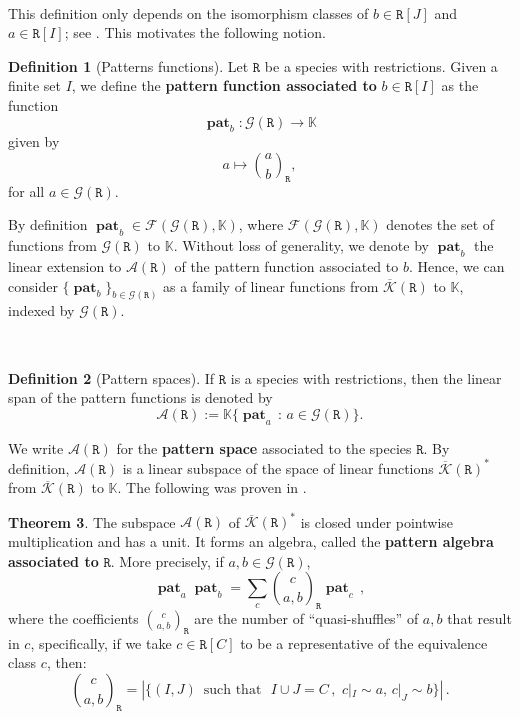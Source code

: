 \documentclass[12pt, reqno]{amsart}
\theoremstyle{definition}
\newtheorem{thm}{Theorem}[section]
\newtheorem{defin}[thm]{Definition}
\DeclareMathOperator{\pat}{\mathbf{pat}}
\newcommand{\prR}{\mathtt{R}}
\newcommand{\Kc}{\mathcal{K}}
\newcommand{\Kcb}{\overline{\Kc}}
\begin{document}
\

This definition only depends on the isomorphism classes of $b \in \prR[J]$ and $a \in \prR[I]$; see \cite{Penaguiao2020}. This motivates the following notion.

\begin{defin}[Patterns functions]\label{defin:pattern}
Let $\prR$ be a species with restrictions. Given a finite set $I$, we define the {\bf pattern function associated to} $b \in \prR[I]$ as the function
\[\pat_b: \mathcal{G}(\prR) \to \mathbb{K} \]
given by
\begin{equation}
    a \mapsto \binom{a}{b}_{\!\prR},
\end{equation}
for all $a \in \mathcal{G}(\prR)$.
\end{defin}

By definition $\pat_b \in \mathcal{F}(\mathcal{G}(\prR), \mathbb{K})$, where $\mathcal{F}(\mathcal{G}(\prR), \mathbb{K})$ denotes the set of functions from $\mathcal{G}(\prR)$ to $\mathbb{K}$. Without loss of generality, we denote by $\pat_b$ the linear extension to $\mathcal{A}(\mathtt{\prR})$ of the pattern function associated to $b$. Hence, we can consider $\{ \pat_b \}_{b\in \mathcal{G}(\prR)}$ as a family of linear functions from $\Kcb(\prR)$ to $\mathbb{K}$, indexed by $\mathcal{G}(\prR)$.

\

\begin{defin}[Pattern spaces]
If $\prR$ is a species with restrictions, then the linear span of the pattern functions is denoted by
\begin{equation}
    \mathcal{A}(\prR):=\mathbb{K}\{\pat_a \, : \, a\in \mathcal{G}(\prR)\}.
\end{equation}
\end{defin}

We write $\mathcal{A}(\prR)$ for the {\bf pattern space} associated to the species $\prR$. By definition, $\mathcal{A}(\prR)$ is a linear subspace of the space of linear functions $\Kcb(\prR)^*$ from $\Kcb(\prR)$ to $\mathbb{K}$. The following was proven in \cite{Penaguiao2020}.

\begin{thm}
The subspace $\mathcal{A}(\prR)$ of $\Kcb(\prR)^*$ is closed under pointwise multiplication and has a unit.
It forms an algebra, called the {\bf pattern algebra associated to} $\prR$.
More precisely, if $a, b \in \mathcal G(\prR)$,
\begin{equation}\label{eq:prodrule}
\pat_ a   \pat_b = \sum_c \binom{c}{a, b}_{\! \prR} \pat_c \, ,
\end{equation}
where the coefficients $\binom{c}{a, b}_{\!\prR}$ are the number of ``quasi-shuffles'' of $a, b$ that result in $c$, specifically, if we take $c\in \prR[C]$ to be a representative of the equivalence class $c$, then:
$$ \binom{c}{a, b}_{\!\prR} = \left| \{(I, J) \, \text{ such that } \, \,  I \cup J = C \, ,\, \, c|_{I} \sim a, \, c|_{J} \sim b \} \right| \, .  $$
\end{thm} 
\end{document}
